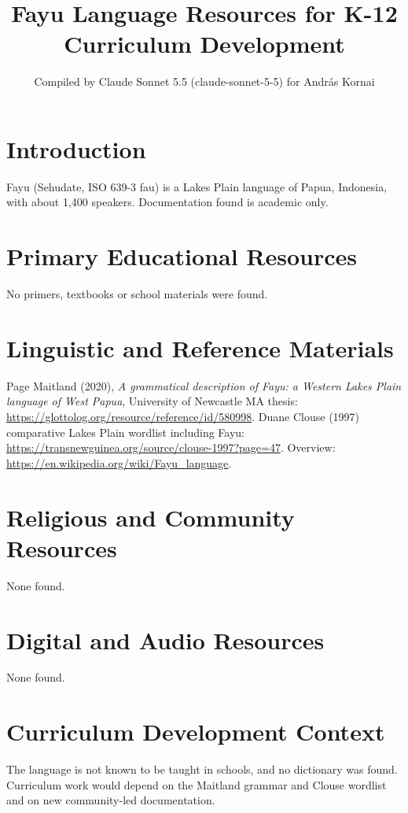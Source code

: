 \documentclass[12pt]{article}
\title{Fayu Language Resources for K-12 Curriculum Development}
\author{Compiled by Claude Sonnet 5.5 (claude-sonnet-5-5) for Andr\'as Kornai}
\date{}
\begin{document}
\maketitle
\section{Introduction}
Fayu (Sehudate, ISO 639-3 fau) is a Lakes Plain language of Papua, Indonesia, with about 1,400 speakers. Documentation found is academic only.
\section{Primary Educational Resources}
No primers, textbooks or school materials were found.
\section{Linguistic and Reference Materials}
Page Maitland (2020), \emph{A grammatical description of Fayu: a Western Lakes Plain language of West Papua}, University of Newcastle MA thesis: \url{https://glottolog.org/resource/reference/id/580998}. Duane Clouse (1997) comparative Lakes Plain wordlist including Fayu: \url{https://transnewguinea.org/source/clouse-1997?page=47}. Overview: \url{https://en.wikipedia.org/wiki/Fayu_language}.
\section{Religious and Community Resources}
None found.
\section{Digital and Audio Resources}
None found.
\section{Curriculum Development Context}
The language is not known to be taught in schools, and no dictionary was found. Curriculum work would depend on the Maitland grammar and Clouse wordlist and on new community-led documentation.
\end{document}
